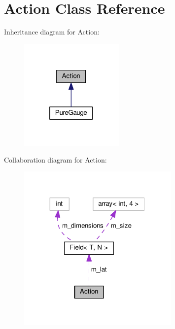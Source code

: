 \hypertarget{classAction}{}\section{Action Class Reference}
\label{classAction}


Inheritance diagram for Action\+:
\nopagebreak
\begin{figure}[H]
\begin{center}
\leavevmode
\includegraphics[width=145pt]{classAction__inherit__graph}
\end{center}
\end{figure}


Collaboration diagram for Action\+:
\nopagebreak
\begin{figure}[H]
\begin{center}
\leavevmode
\includegraphics[width=224pt]{classAction__coll__graph}
\end{center}
\end{figure}
